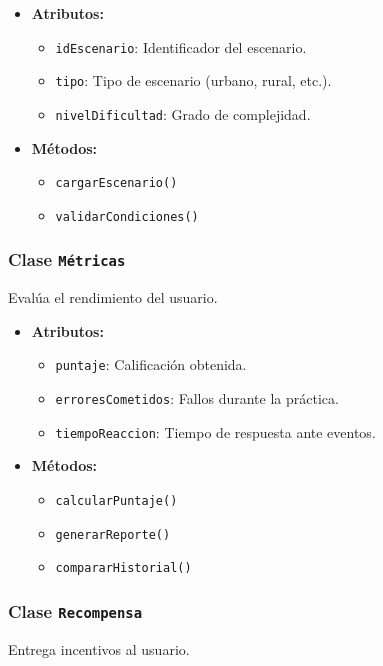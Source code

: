 \documentclass[12pt]{article}
\begin{document}
\begin{itemize}
    \item \textbf{Atributos:}
    \begin{itemize}
        \item \texttt{idEscenario}: Identificador del escenario.
        \item \texttt{tipo}: Tipo de escenario (urbano, rural, etc.).
        \item \texttt{nivelDificultad}: Grado de complejidad.
    \end{itemize}
    \item \textbf{Métodos:}
    \begin{itemize}
        \item \texttt{cargarEscenario()}
        \item \texttt{validarCondiciones()}
    \end{itemize}
\end{itemize}

\subsubsection*{Clase \texttt{Métricas}}
Evalúa el rendimiento del usuario.

\begin{itemize}
    \item \textbf{Atributos:}
    \begin{itemize}
        \item \texttt{puntaje}: Calificación obtenida.
        \item \texttt{erroresCometidos}: Fallos durante la práctica.
        \item \texttt{tiempoReaccion}: Tiempo de respuesta ante eventos.
    \end{itemize}
    \item \textbf{Métodos:}
    \begin{itemize}
        \item \texttt{calcularPuntaje()}
        \item \texttt{generarReporte()}
        \item \texttt{compararHistorial()}
    \end{itemize}
\end{itemize}

\subsubsection*{Clase \texttt{Recompensa}}
Entrega incentivos al usuario.
\end{document}
